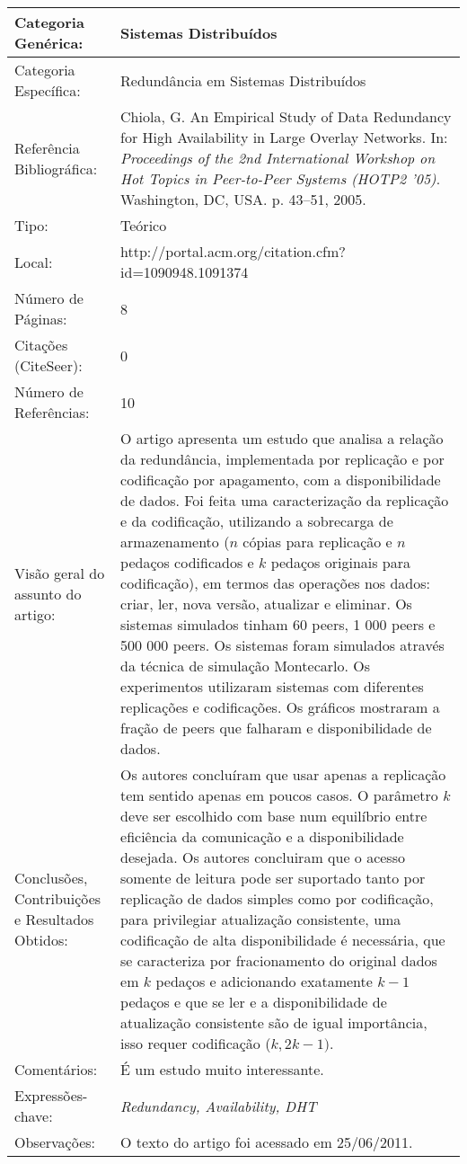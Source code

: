 \documentclass[10pt,a4paper]{article}
\begin{document}
\begin{center}
\begin{tabular}{|p{5cm}||p{10cm}|}
\hline
Categoria Genérica: & Sistemas Distribuídos\\\hline
Categoria Específica: &  Redundância em Sistemas Distribuídos\\\hline
Referência Bibliográfica: & Chiola, G. An Empirical Study of Data Redundancy for High Availability in Large Overlay Networks. In:  \emph{Proceedings of the 2nd International Workshop on Hot Topics in Peer-to-Peer Systems (HOTP2 '05)}. Washington, DC, USA. p. 43--51, 2005.\\\hline
Tipo: & Teórico\\\hline
Local: & http://portal.acm.org/citation.cfm?id=1090948.1091374\\\hline
Número de Páginas: & 8\\\hline
Citações (CiteSeer): & 0\\\hline
Número de Referências: & 10\\\hline
Visão geral do assunto do artigo: & O artigo apresenta um estudo que analisa a relação da redundância, implementada por replicação e por codificação por apagamento, com a disponibilidade de dados. Foi feita uma caracterização da replicação e da codificação, utilizando a sobrecarga de armazenamento ($n$ cópias para replicação e $n$ pedaços codificados e $k$ pedaços originais para codificação), em termos das operações nos dados: criar, ler, nova versão, atualizar e eliminar. Os sistemas simulados tinham 60 peers, 1 000 peers e 500 000 peers. Os sistemas foram simulados através da técnica de simulação Montecarlo. Os experimentos utilizaram sistemas com diferentes replicações e codificações. Os gráficos mostraram a fração de peers que falharam e disponibilidade de dados.\\\hline
Conclusões, Contribuições e Resultados Obtidos: & Os autores concluíram que usar apenas a replicação tem sentido apenas em poucos casos. O parâmetro $k$ deve ser escolhido com base num equilíbrio entre eficiência da comunicação e a disponibilidade desejada. Os autores concluiram que o acesso somente de leitura pode ser suportado tanto por replicação de dados simples como por codificação, para privilegiar atualização consistente, uma codificação de alta disponibilidade é necessária, que se caracteriza por fracionamento do original dados em $k$ pedaços e adicionando exatamente $k-1$ pedaços e que se ler e a disponibilidade de atualização consistente são de igual importância, isso requer codificação ($k, 2k-1)$.\\\hline
Comentários: & É um estudo muito interessante.\\\hline
Expressões-chave: & \emph{Redundancy, Availability, DHT}\\\hline
Observações: & O texto do artigo foi acessado em 25/06/2011.\\\hline

\end{tabular}
\end{center}
\end{document}
